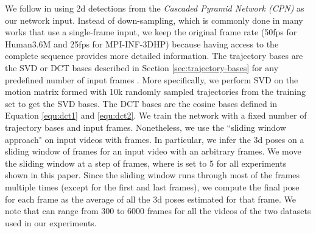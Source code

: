 \documentclass{bmvc2k}
\begin{document}
We follow \cite{pavllo20183d} in using 2d detections from the \textit{Cascaded Pyramid Network (CPN)} \cite{chen2018cascaded} as our network input. Instead of down-sampling, which is commonly done in many works that use a single-frame input, we keep the original frame rate (50fps for Human3.6M and 25fps for MPI-INF-3DHP) because having access to the complete sequence provides more detailed information. 
The trajectory bases are the SVD or DCT bases described in Section \ref{sec:trajectory-bases}
for any predefined number of input frames . More specifically, we perform SVD on the motion matrix formed with 10k randomly sampled trajectories from the training set to get the SVD bases. The DCT bases are the cosine bases defined in Equation \ref{equ:dct1} and \ref{equ:dct2}. 
We train the network with a fixed number of  trajectory bases and  input frames. Nonetheless, we use the ``sliding window approach" on input videos with  frames. In particular, we infer the 3d poses on a sliding window of  frames 
for an input video with an arbitrary  frames. We move the sliding window at a step of  frames, where  is set to 5 for all experiments shown in this paper.
Since the sliding window runs through most of the frames multiple times (except for the first and last frames), 
we compute the final pose for each frame as the average of all the 3d poses estimated for that frame. 
We note that  can range from 300 to 6000 frames for all the videos of the two datasets used in our experiments.


\renewcommand{\arraystretch}{1.1}
\end{document}
